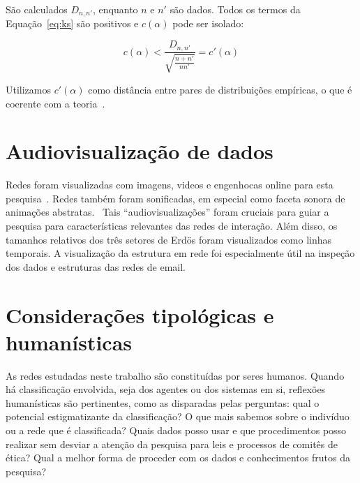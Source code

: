 \documentclass[a4paper,openright,12pt]{report} %
\begin{document}
São calculados $D_{n,n'}$, enquanto $n$ e $n'$ são dados.
Todos os termos da Equação~\ref{eq:ks} são positivos
e $c(\alpha)$ pode ser isolado:

\begin{equation}\label{eq:ks2}
c(\alpha) < \frac{D_{n,n'}}{\sqrt{\frac{n+n'}{nn'}}} = c'(\alpha)
\end{equation}

Utilizamos $c'(\alpha)$
como distância entre pares de distribuições empíricas,
o que é coerente com a teoria~\cite{wpKol}.




\section{Audiovisualização de dados}\label{sec:aud}
Redes foram visualizadas com imagens, videos e engenhocas online para esta pesquisa~\cite{animacoes,galGMANE,appGMANE}.
Redes também foram sonificadas, em especial como faceta sonora de animações abstratas.~\cite{preludio,4hubs,gmanePack,social}
Tais ``audiovisualizações'' foram cruciais para guiar a pesquisa para
características relevantes das redes de interação.
Além disso, os tamanhos relativos dos três setores de Erdös foram visualizados como linhas temporais.
A visualização da estrutura em rede foi especialmente útil na inspeção
dos dados e estruturas das redes de email.~\cite{animacoes}

\section{Considerações tipológicas e humanísticas}\label{sec:tip}
As redes estudadas neste trabalho são constituídas por seres humanos.
Quando há classificação envolvida, seja dos agentes
ou dos sistemas em si, reflexões humanísticas são pertinentes,
como as disparadas pelas perguntas:
    qual o potencial estigmatizante da classificação?
    O que mais sabemos sobre o indivíduo ou a rede que é classificada?
    Quais dados posso usar e que procedimentos posso realizar
	    sem desviar a atenção da pesquisa para leis e processos de comitês de ética?
    Qual a melhor forma de proceder com os dados e conhecimentos frutos da pesquisa?
\end{document}
